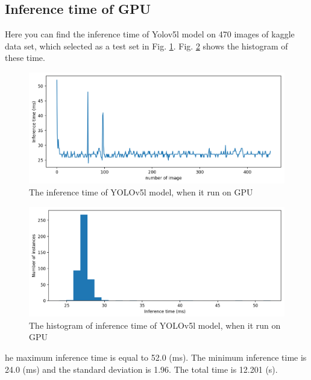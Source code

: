 \documentclass[12pt,a4paper]{article}
\begin{document}
\subsection*{Inference time of GPU}
 Here you can find the inference time of Yolov5l model on 470 images of kaggle data set, which selected as a test set in Fig. \ref{fig: gpul}. Fig. \ref{fig: gpul_hist} shows the histogram of these time.
\begin{figure}[H]
    \centering
    \includegraphics[width=15cm]{figures/Inftime_yolovL_gpu.png}
    \caption{The inference time of YOLOv5l model, when it run on GPU}
    \label{fig: gpul}
\end{figure}
\begin{figure}[H]
    \centering
    \includegraphics[width=15cm]{figures/Inftime_yolov5L_gpu_hist.png}
    \caption{The histogram of inference time of YOLOv5l model, when it run on GPU}
    \label{fig: gpul_hist}
\end{figure}
he maximum inference time is equal to 52.0 (ms). The minimum inference time is 24.0 (ms) and the standard deviation is 1.96. The total time is 12.201 (s).
\end{document}
